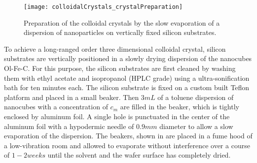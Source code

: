 \documentclass[\main/dresen_thesis.tex]{subfiles}
\begin{document}
  \begin{figure}[tb]
    \centering
    \texttt{[image: colloidalCrystals\_crystalPreparation]}
    \caption{\label{fig:colloidalCrystals:preparation:image}Preparation of the colloidal crystals by the slow evaporation of a dispersion of nanoparticles on vertically fixed silicon substrates.}
  \end{figure}

  To achieve a long-ranged order three dimensional colloidal crystal, silicon substrates are vertically positioned in a slowly drying dispersion of the nanocubes Ol-Fe-C.
  For this purpose, the silicon substrates are first cleaned by washing them with ethyl acetate and isopropanol (HPLC grade) using a ultra-sonification bath for ten minutes each.
  The silicon substrate is fixed on a custom built Teflon platform and placed in a small beaker.
  Then $3 \unit{mL}$ of a toluene dispersion of nanocubes with a concentration of $c_m$ are filled in the beaker, which is tightly enclosed by aluminum foil.
  A single hole is punctuated in the center of the aluminum foil with a hypodermic needle of $0.9 \unit{mm}$ diameter to allow a slow evaporation of the dispersion.
  The beakers, shown in  are placed in a fume hood of a low-vibration room and allowed to evaporate without interference over a course of $1 - 2 \unit{weeks}$ until the solvent and the wafer surface has completely dried.
\end{document}
